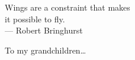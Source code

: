 \cleardoublepage
\thispagestyle{empty}


\vspace*{3cm}

\begin{raggedleft}
    	Wings are a constraint that makes \\
	it possible to fly.\\
     --- Robert Bringhurst\\
\end{raggedleft}

\vspace{4cm}

\begin{center}
    To my grandchildren\dots
\end{center}


